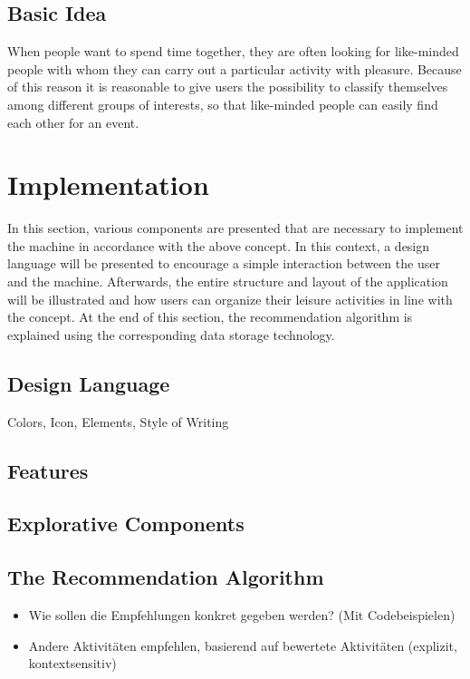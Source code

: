 \documentclass[12pt,numbers=noenddot,parskip,bibliography=totocnumbered,listof=totocnumbered]{scrreprt}
\begin{document}
\subsection{Basic Idea}
When people want to spend time together, they are often looking for like-minded people with whom they can carry out a particular activity with pleasure. Because of this reason it is reasonable to give users the possibility to classify themselves among different groups of interests, so that like-minded people can easily find each other for an event. 


\section{Implementation}
In this section, various components are presented that are necessary to implement the machine in accordance with the above concept. In this context, a design language will be presented to encourage a simple interaction between the user and the machine. Afterwards, the entire structure and layout of the application will be illustrated and how users can organize their leisure activities in line with the concept. At the end of this section, the recommendation algorithm is explained using the corresponding data storage technology.

\subsection{Design Language} 
Colors, Icon, Elements, Style of Writing



\subsection{Features}

\subsection{Explorative Components}

\subsection{The Recommendation Algorithm}
\begin{itemize} 
	\item Wie sollen die Empfehlungen konkret gegeben werden? (Mit Codebeispielen)
	\item Andere Aktivitäten empfehlen, basierend auf bewertete Aktivitäten (explizit, kontextsensitiv)
\end{itemize} 
	
\end{document}
